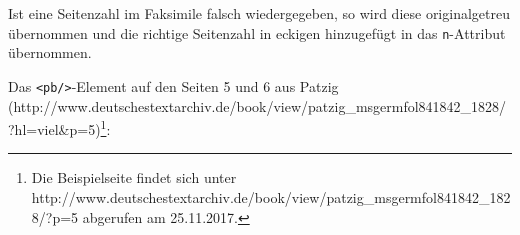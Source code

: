 \begin{Shaded}
\begin{Highlighting}[]
\KeywordTok{/>}
\end{Highlighting}
\end{Shaded}

Ist eine Seitenzahl im Faksimile falsch wiedergegeben, so wird diese
originalgetreu übernommen und die richtige Seitenzahl in eckigen
hinzugefügt in das \texttt{n}-Attribut übernommen.

\begin{Shaded}
\begin{Highlighting}[]
\KeywordTok{/>}
\end{Highlighting}
\end{Shaded}

Das \texttt{\textless{}pb/\textgreater{}}-Element auf den Seiten 5 und 6
aus Patzig
(http://www.deutschestextarchiv.de/book/view/patzig\_msgermfol841842\_1828/
?hl=viel\&p=5)\footnote{Die Beispielseite findet sich unter
  http://www.deutschestextarchiv.de/book/view/patzig\_msgermfol841842\_1828/?p=5
  abgerufen am 25.11.2017.}:

\begin{Shaded}
\begin{Highlighting}[]
\KeywordTok{>}
\KeywordTok{/>}
\ErrorTok{<}\ErrorTok{<}
\KeywordTok{>}
\KeywordTok{/>}
\KeywordTok{>}
\end{Highlighting}
\end{Shaded}

